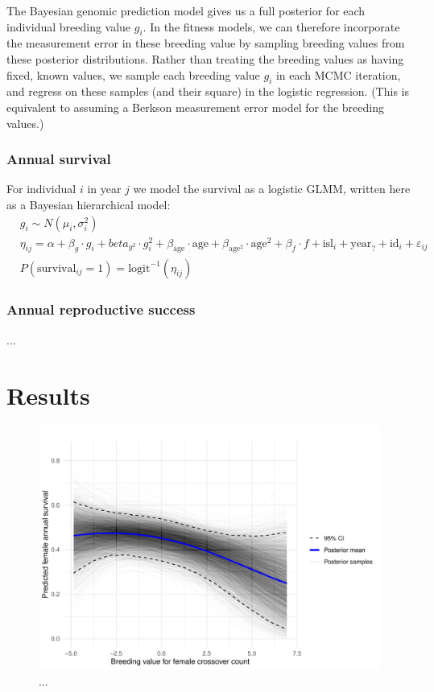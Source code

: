 \documentclass[dvipsnames]{article}
\begin{document}
The Bayesian genomic prediction model gives us a full posterior for each individual breeding value $g_i$. 
In the fitness models, we can therefore incorporate the measurement error in these breeding value by sampling breeding values from these posterior distributions. 
Rather than treating the breeding values as having fixed, known values, we sample each breeding value $g_i$ in each MCMC iteration, and regress on these samples (and their square) in the logistic regression. 
(This is equivalent to assuming a Berkson measurement error model for the breeding values.)

\subsubsection*{Annual survival}

For individual $i$ in year $j$ we model the survival as a logistic GLMM, written here as a Bayesian hierarchical model:
\begin{align*}
    &g_i \sim N(\mu_i, \sigma_i^2) \\
    &\eta_{ij} = \alpha + \beta_g \cdot g_i + beta_{g^2} \cdot g_i^2 + \beta_\text{age} \cdot \text{age} + \beta_{\text{age}^2} \cdot \text{age}^2 + \beta_f \cdot f + \text{isl}_i + \text{year}_? + \text{id}_i + \varepsilon_{ij}\\
    &P(\text{survival}_{ij} = 1) = \text{logit}^{-1}(\eta_{ij})
\end{align*}


\subsubsection*{Annual reproductive success}

...

\section*{Results}

\begin{figure}
    \centering
    \includegraphics[width=0.91\linewidth]{figs/surv_bv_pred_f.pdf}
    \caption{...}
    \label{fig-surv_bv_f}
\end{figure}
\end{document}
